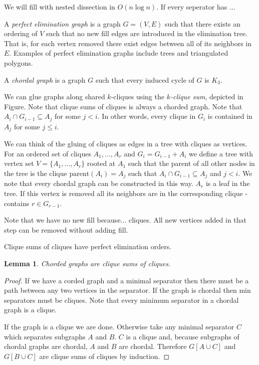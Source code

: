 \documentclass{article}
\newtheorem{lemma}{Lemma}
\begin{document}
We will fill with nested dissection in $O(n\log n)$.
If every seperator has ...

A \emph{perfect elimination graph} is a graph $G=(V,E)$ such that there exists an ordering of $V$ such that no new fill edges are introduced in the elimination tree.
That is, for each vertex removed there exist edges between all of its neighbors in $E$.
Examples of perfect elimination graphs include trees and triangulated polygons.

\begin{definition}
    A \emph{chordal graph} is a graph $G$ such that every induced cycle of $G$ is $K_3$.
\end{definition}

We can glue graphs along shared $k$-cliques using the \emph{$k$-clique sum}, depicted in Figure.%
Note that clique sums of cliques is always a chorded graph.
Note that $A_i\cap G_{i-1}\subseteq A_j$ for some $j < i$.
In other words, every clique in $G_i$ is contained in $A_j$ for some $j\leq i$.

We can think of the gluing of cliques as edges in a tree with cliques as vertices.
For an ordered set of cliques $A_1,\ldots, A_r$ and $G_i = G_{i-1} + A_i$ we define a tree with vertex set $V=\{A_1,\ldots, A_r\}$ rooted at $A_1$ such that the parent of all other nodes in the tree is the clique $\mathrm{parent}(A_i) = A_j$ such that $A_i\cap G_{i-1} \subseteq A_j$ and $j < i$.
We note that every chordal graph can be constructed in this way.
$A_r$ is a leaf in the tree.
If this vertex is removed all its neighbors are in the corresponding clique - contains $r\in G_{r-1}$.

Note that we have no new fill because... cliques.
All new vertices added in that step can be removed without adding fill.

\begin{corollary}\label{cor:clique_perfect}
    Clique sums of cliques have perfect elimination orders.
\end{corollary}

\begin{lemma}\label{lem:chord_sums}
    Chorded graphs are clique sums of cliques.
\end{lemma}
\begin{proof}

    If we have a corded graph and a minimal separator then there must be a path between any two vertices in the separator.
    If the graph is chordal then min separators must be cliques.
    Note that every minimum separator in a chordal graph is a clique.

    If the graph is a clique we are done.
    Otherwise take any minimal separator $C$ which separates subgraphs $A$ and $B$.
    $C$ is a clique and, because subgraphs of chordal graphs are chordal, $A$ and $B$ are chordal.
    Therefore $G[A\cup C]$ and $G[B\cup C]$ are clique sums of cliques by induction.
\end{proof}
\end{document}
